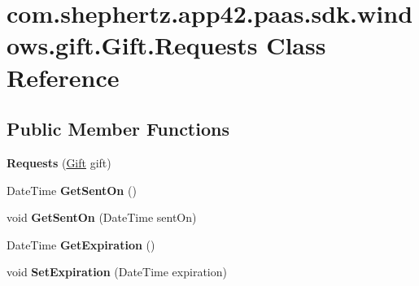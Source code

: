 \hypertarget{classcom_1_1shephertz_1_1app42_1_1paas_1_1sdk_1_1windows_1_1gift_1_1_gift_1_1_requests}{\section{com.\+shephertz.\+app42.\+paas.\+sdk.\+windows.\+gift.\+Gift.\+Requests Class Reference}
\label{classcom_1_1shephertz_1_1app42_1_1paas_1_1sdk_1_1windows_1_1gift_1_1_gift_1_1_requests}
}
\subsection*{Public Member Functions}
\begin{DoxyCompactItemize}
\item 
\hypertarget{classcom_1_1shephertz_1_1app42_1_1paas_1_1sdk_1_1windows_1_1gift_1_1_gift_1_1_requests_a8ad74a159a1586d84a4e573685d8cb23}{{\bfseries Requests} (\hyperlink{classcom_1_1shephertz_1_1app42_1_1paas_1_1sdk_1_1windows_1_1gift_1_1_gift}{Gift} gift)}\label{classcom_1_1shephertz_1_1app42_1_1paas_1_1sdk_1_1windows_1_1gift_1_1_gift_1_1_requests_a8ad74a159a1586d84a4e573685d8cb23}

\item 
\hypertarget{classcom_1_1shephertz_1_1app42_1_1paas_1_1sdk_1_1windows_1_1gift_1_1_gift_1_1_requests_a8c6e6fee5f73a96aa797d74f44d5d658}{Date\+Time {\bfseries Get\+Sent\+On} ()}\label{classcom_1_1shephertz_1_1app42_1_1paas_1_1sdk_1_1windows_1_1gift_1_1_gift_1_1_requests_a8c6e6fee5f73a96aa797d74f44d5d658}

\item 
\hypertarget{classcom_1_1shephertz_1_1app42_1_1paas_1_1sdk_1_1windows_1_1gift_1_1_gift_1_1_requests_a994088e7b46fdc4ea1212974dfd5a4fd}{void {\bfseries Get\+Sent\+On} (Date\+Time sent\+On)}\label{classcom_1_1shephertz_1_1app42_1_1paas_1_1sdk_1_1windows_1_1gift_1_1_gift_1_1_requests_a994088e7b46fdc4ea1212974dfd5a4fd}

\item 
\hypertarget{classcom_1_1shephertz_1_1app42_1_1paas_1_1sdk_1_1windows_1_1gift_1_1_gift_1_1_requests_aaf3df7c340186fbf811d38dd1599dc32}{Date\+Time {\bfseries Get\+Expiration} ()}\label{classcom_1_1shephertz_1_1app42_1_1paas_1_1sdk_1_1windows_1_1gift_1_1_gift_1_1_requests_aaf3df7c340186fbf811d38dd1599dc32}

\item 
\hypertarget{classcom_1_1shephertz_1_1app42_1_1paas_1_1sdk_1_1windows_1_1gift_1_1_gift_1_1_requests_a1a4f2dd2d87a4b13482229e1f679d412}{void {\bfseries Set\+Expiration} (Date\+Time expiration)}\label{classcom_1_1shephertz_1_1app42_1_1paas_1_1sdk_1_1windows_1_1gift_1_1_gift_1_1_requests_a1a4f2dd2d87a4b13482229e1f679d412}


\end{DoxyCompactItemize}
